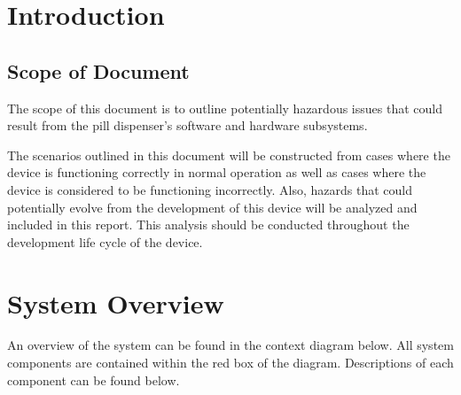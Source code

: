 \documentclass[12pt]{article}
\begin{document}
 
\pagebreak
\pagestyle{fancy} \fancyhf{}
  \cfoot{\thepage}


\pagebreak
\tableofcontents
\listoffigures
\listoftables
\pagebreak
{}

\section{Introduction}

\subsection{Scope of Document}
The scope of this document is to outline potentially hazardous issues that could result from the pill dispenser's software and hardware subsystems.

The scenarios outlined in this document will be constructed from cases where the device is functioning correctly in normal operation as well as cases where the device is considered to be functioning incorrectly. Also, hazards that could potentially evolve from the development of this device will be analyzed and included in this report. This analysis should be conducted throughout the development life cycle of the device. 



\section{System Overview}

\noindent An overview of the system can be found in the context diagram below. All system components are contained within the red box of the diagram. Descriptions of each component can be found below.
\end{document}
